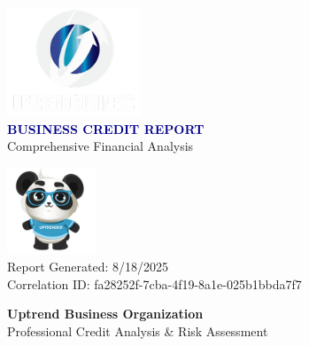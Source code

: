 \documentclass[11pt,a4paper]{article}
\begin{document}
\begin{titlepage}
    \centering
    \vspace*{2cm}
    
    \includegraphics[width=0.3\textwidth]{uptrend_logo.png}\\[1cm]
    
    {\huge\textbf{\textcolor{darkblue}{BUSINESS CREDIT REPORT}}}\\[0.5cm]
    
    {\Large\textcolor{uptrendblue}{Comprehensive Financial Analysis}}\\[2cm]
    
    
    \vspace{2cm}
    
    \includegraphics[width=0.2\textwidth]{uptrend_mascot.png}\\[1cm]
    
    {\large\textcolor{uptrendgray}{Report Generated: 8/18/2025}}\\[0.3cm]
    {\large\textcolor{uptrendgray}{Correlation ID: fa28252f-7cba-4f19-8a1e-025b1bbda7f7}}
    
    \vfill
    
    {\textcolor{uptrendblue}{\textbf{Uptrend Business Organization}}}\\
    {\small Professional Credit Analysis \& Risk Assessment}
    
\end{titlepage}
\end{document}
